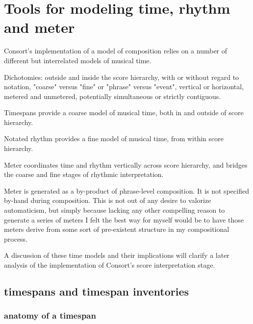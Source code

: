 \chapter{Tools for modeling time, rhythm and meter}

\begin{comment}
<abjad>[hide=true]
import consort
</abjad>
\end{comment}

Consort's implementation of a model of composition relies on a number of
different but interrelated models of musical time.

Dichotomies: outside and inside the score hierarchy, with or without regard to
notation, "coarse" versus "fine" or "phrase" versus "event", vertical or
horizontal, metered and unmetered, potentially simultaneous or strictly
contiguous.

Timespans provide a coarse model of musical time, both in and outside of score
hierarchy.

Notated rhythm provides a fine model of musical time, from within score
hierarchy.

Meter coordinates time and rhythm vertically across score hierarchy, and
bridges the coarse and fine stages of rhythmic interpretation.

Meter is generated as a by-product of phrase-level composition. It is not
specified by-hand during composition. This is not out of any desire to valorize
automaticism, but simply because lacking any other compelling reason to
generate a series of meters I felt the best way for myself would be to have
those meters derive from some sort of pre-existent structure in my
compositional process.

A discussion of these time models and their implications will clarify a later
analysis of the implementation of Consort's score interpretation
stage.

\section{timespans and timespan inventories}

\subsection{anatomy of a timespan}

\begin{comment}
<abjad>
timespan = timespantools.Timespan(
    start_offset=Offset(1, 4),
    stop_offset=Offset(3, 2),
    )
</abjad>
\end{comment}

